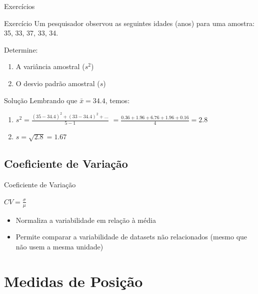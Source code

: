 \documentclass{beamer}
\begin{document}
\begin{frame}{Exercícios}
  \begin{block}{Exercício}
    Um pesquisador observou as seguintes idades (anos) para uma amostra:
    35, 33, 37, 33, 34.
    
    Determine:
    \begin{enumerate}
    \item<1-> A variância amostral ($s^2$)
    \item<1-> O desvio padrão amostral ($s$)
    \end{enumerate}
  \end{block}
  
  \begin{block}{Solução}
    Lembrando que $\bar{x} = 34.4$, temos:
    \begin{enumerate}
    \item $s^2 =
      \frac{(35-34.4)^2+(33-34.4)^2+\ldots}{5-1}$
      $=\frac{0.36+1.96+6.76+1.96+0.16}{4}=2.8$
    \item $s = \sqrt{2.8} = 1.67 $
    \end{enumerate}
  \end{block}
\end{frame}


\subsection{Coeficiente de Variação}
\begin{frame}{Coeficiente de Variação}
  \begin{definition}
    $CV = \frac{\sigma}{\mu}$
  \end{definition}
  \begin{itemize}
  \item Normaliza a variabilidade em relação à média
  \item Permite comparar a variabilidade de datasets não relacionados
    (mesmo que não usem a mesma unidade)
  \end{itemize}
  \begin{example}
    
  \end{example}
\end{frame}


\section{Medidas de Posição}
\end{document}
